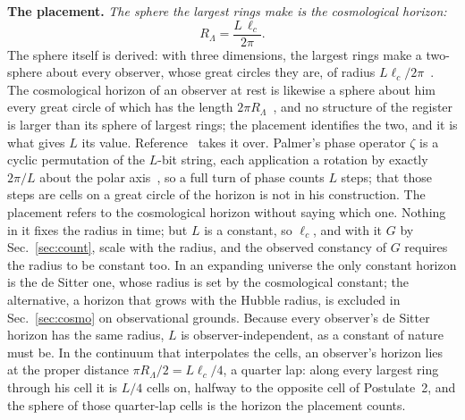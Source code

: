 \documentclass[aps,prd,twocolumn,superscriptaddress,nofootinbib,showkeys]{revtex4-2}
\newcommand{\lc}{\ell_c}
\newcommand{\RL}{R_\Lambda}
\begin{document}
\textbf{The placement.} \emph{The sphere the largest rings make is the cosmological horizon:}
\begin{equation}
\RL = \frac{L\,\lc}{2\pi} .
\label{eq:ident}
\end{equation}
The sphere itself is derived: with three dimensions, the largest rings make a two-sphere about every observer, whose great circles they are, of radius $L\lc/2\pi$~\cite{korytko2026d}. The cosmological horizon of an observer at rest is likewise a sphere about him every great circle of which has the length $2\pi\RL$~\cite{gibbons1977}, and no structure of the register is larger than its sphere of largest rings; the placement identifies the two, and it is what gives $L$ its value. Reference~\cite{korytko2026c} takes it over. Palmer's phase operator $\zeta$ is a cyclic permutation of the $L$-bit string, each application a rotation by exactly $2\pi/L$ about the polar axis~\cite{palmer2026}, so a full turn of phase counts $L$ steps; that those steps are cells on a great circle of the horizon is not in his construction. The placement refers to the cosmological horizon without saying which one. Nothing in it fixes the radius in time; but $L$ is a constant, so $\lc$, and with it $G$ by Sec.~\ref{sec:count}, scale with the radius, and the observed constancy of $G$ requires the radius to be constant too. In an expanding universe the only constant horizon is the de Sitter one, whose radius is set by the cosmological constant; the alternative, a horizon that grows with the Hubble radius, is excluded in Sec.~\ref{sec:cosmo} on observational grounds. Because every observer's de Sitter horizon has the same radius, $L$ is observer-independent, as a constant of nature must be. In the continuum that interpolates the cells, an observer's horizon lies at the proper distance $\pi\RL/2 = L\lc/4$, a quarter lap: along every largest ring through his cell it is $L/4$ cells on, halfway to the opposite cell of Postulate~2, and the sphere of those quarter-lap cells is the horizon the placement counts.
\end{document}
